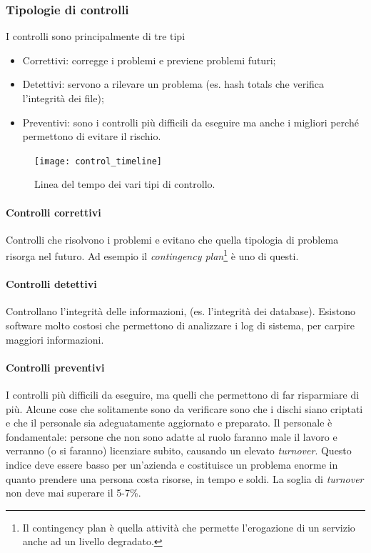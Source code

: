 \subsubsection{Tipologie di controlli}

I controlli sono principalmente di tre tipi
\begin{itemize}
\item Correttivi: corregge i problemi e previene problemi futuri;
\item Detettivi: servono a rilevare un problema (es. hash totals che 
verifica l'integrità dei file);
\item Preventivi: sono i controlli più difficili da eseguire ma anche 
i migliori perché permettono di evitare il rischio.
\end{itemize}

\begin{figure}[H]
	\begin{center}	
\texttt{[image: control\_timeline]}
	\end{center}
	\caption{Linea del tempo dei vari tipi di controllo.}
\end{figure}

\paragraph*{Controlli correttivi} Controlli che risolvono i problemi e 
evitano che quella tipologia di problema risorga nel futuro. Ad esempio il 
\textit{contingency plan}\footnote{Il contingency plan è quella 
attività che permette l'erogazione di un servizio anche ad un livello 
degradato.} è uno di questi.

\paragraph*{Controlli detettivi} Controllano l'integrità delle 
informazioni, (es. l'integrità dei database). Esistono software 
molto costosi che permettono di analizzare i log di sistema, per carpire 
maggiori informazioni.

\paragraph*{Controlli preventivi} I controlli più difficili da eseguire, ma 
quelli che permettono di far risparmiare di più. Alcune cose che solitamente 
sono da verificare sono che i dischi siano criptati e che il 
personale sia adeguatamente aggiornato e preparato.
Il personale è fondamentale: persone che non sono adatte al ruolo faranno male 
il lavoro e verranno (o si faranno) licenziare subito, causando un 
elevato \textit{turnover}. Questo indice deve essere basso per un'azienda e 
costituisce un problema enorme in quanto prendere una persona costa risorse, in 
tempo e soldi. La soglia di \textit{turnover} non deve mai superare il 5-7\%.

